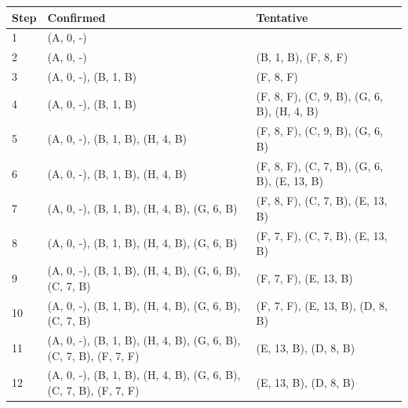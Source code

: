 \documentclass[10pt, a4paper]{article}
\begin{document}
\begin{enumerate}
\begin{center}
    \end{center}
    \color{blue}
    {\footnotesize
        \begin{tabular}{lll}
            \toprule
            Step & Confirmed & Tentative\\
            \hline
            1 & (A, 0, -) & \\
            2 & (A, 0, -) & (B, 1, B), (F, 8, F)\\
            3 & (A, 0, -), (B, 1, B) & (F, 8, F)\\
            4 & (A, 0, -), (B, 1, B) & (F, 8, F), (C, 9, B), (G, 6, B), (H, 4, B)\\
            5 & (A, 0, -), (B, 1, B), (H, 4, B) & (F, 8, F), (C, 9, B), (G, 6, B)\\
            6 & (A, 0, -), (B, 1, B), (H, 4, B) & (F, 8, F), (C, 7, B), (G, 6, B), (E, 13, B)\\
            7 & (A, 0, -), (B, 1, B), (H, 4, B), (G, 6, B) & (F, 8, F), (C, 7, B), (E, 13, B)\\
            8 & (A, 0, -), (B, 1, B), (H, 4, B), (G, 6, B) & (F, 7, F), (C, 7, B), (E, 13, B)\\
            9 & (A, 0, -), (B, 1, B), (H, 4, B), (G, 6, B), (C, 7, B) & (F, 7, F), (E, 13, B)\\
            10 & (A, 0, -), (B, 1, B), (H, 4, B), (G, 6, B), (C, 7, B) & (F, 7, F), (E, 13, B), (D, 8, B)\\
            11 & (A, 0, -), (B, 1, B), (H, 4, B), (G, 6, B), (C, 7, B), (F, 7, F) & (E, 13, B), (D, 8, B)\\
            12 & (A, 0, -), (B, 1, B), (H, 4, B), (G, 6, B), (C, 7, B), (F, 7, F) & (E, 13, B), (D, 8, B)\\

\end{tabular}}
\end{enumerate}
\end{document}
